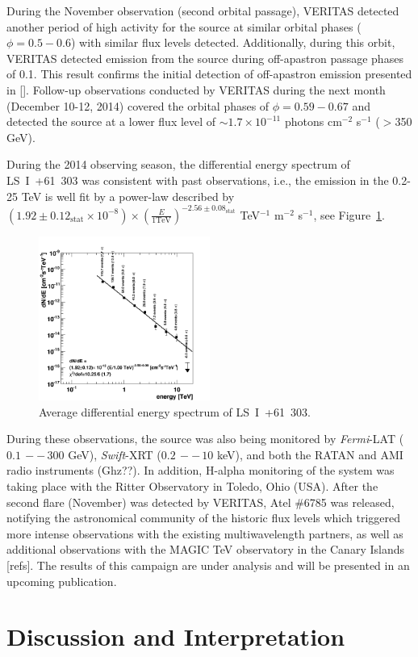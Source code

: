 \documentclass[preprint2]{aastex}
\newcommand{\pflux}{photons cm$^{-2}$ s$^{-1}$}
\newcommand{\lsi}{LS~I~+61~303}
\begin{document}
During the November observation (second orbital passage), VERITAS detected another period of high activity for the source at similar orbital phases ($\phi = 0.5-0.6$) with similar flux levels detected. Additionally, during this orbit, VERITAS detected emission from the source during off-apastron passage phases of 0.1. This result confirms the initial detection of off-apastron emission presented in []. Follow-up observations conducted by VERITAS during the next month (December 10-12, 2014) covered the orbital phases of $\phi=0.59-0.67$ and detected the source at a lower flux level of $\sim1.7\times10^{-11}$ \pflux{} ($>$350 GeV).

During the 2014 observing season, the differential energy spectrum of \lsi{} was consistent with past observations, i.e., the emission in the 0.2-25 TeV is well fit by a power-law described by $\left( 1.92 \pm 0.12_{\mathrm{stat}} \times 10^{-8} \right) \times \left( \frac{E}{\mathrm{1 TeV}} \right)^{-2.56 \pm 0.08_{\mathrm{stat}}}$ TeV$^{-1}$ m$^{-2}$ s$^{-1}$, see Figure~\ref{spec}.

\begin{figure}
\centering
\includegraphics[width=0.5\textwidth]{figs/LSI-mod-replot-spec.png}
\caption{Average differential energy spectrum of \lsi{}.}
\label{spec}
\end{figure}

During these observations, the source was also being monitored by \emph{Fermi}-LAT ($0.1\,--\,300$ GeV), \emph{Swift}-XRT ($0.2\,--\,10$ keV), and both the RATAN and AMI radio instruments (Ghz??). In addition, H-alpha monitoring of the system was taking place with the Ritter Observatory in Toledo, Ohio (USA). After the second flare (November) was detected by VERITAS, Atel $\#$6785 was released, notifying the astronomical community of the historic flux levels which triggered more intense observations with the existing multiwavelength partners, as well as additional observations with the MAGIC TeV observatory in the Canary Islands [refs]. The results of this campaign are under analysis and will be presented in an upcoming publication. 


\section{Discussion and Interpretation}
\end{document}
